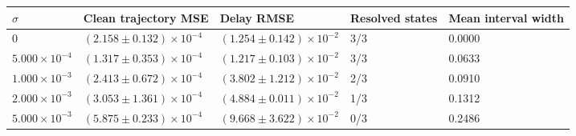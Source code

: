 \begin{tabular}{lllll}
\toprule
\(\sigma\) & Clean trajectory MSE & Delay RMSE & Resolved states & Mean interval width \\
\midrule
$0$ & \((2.158\pm0.132)\times10^{-4}\) & \((1.254\pm0.142)\times10^{-2}\) & 3/3 & 0.0000 \\
\(5.000\times10^{-4}\) & \((1.317\pm0.353)\times10^{-4}\) & \((1.217\pm0.103)\times10^{-2}\) & 3/3 & 0.0633 \\
\(1.000\times10^{-3}\) & \((2.413\pm0.672)\times10^{-4}\) & \((3.802\pm1.212)\times10^{-2}\) & 2/3 & 0.0910 \\
\(2.000\times10^{-3}\) & \((3.053\pm1.361)\times10^{-4}\) & \((4.884\pm0.011)\times10^{-2}\) & 1/3 & 0.1312 \\
\(5.000\times10^{-3}\) & \((5.875\pm0.233)\times10^{-4}\) & \((9.668\pm3.622)\times10^{-2}\) & 0/3 & 0.2486 \\
\bottomrule
\end{tabular}
